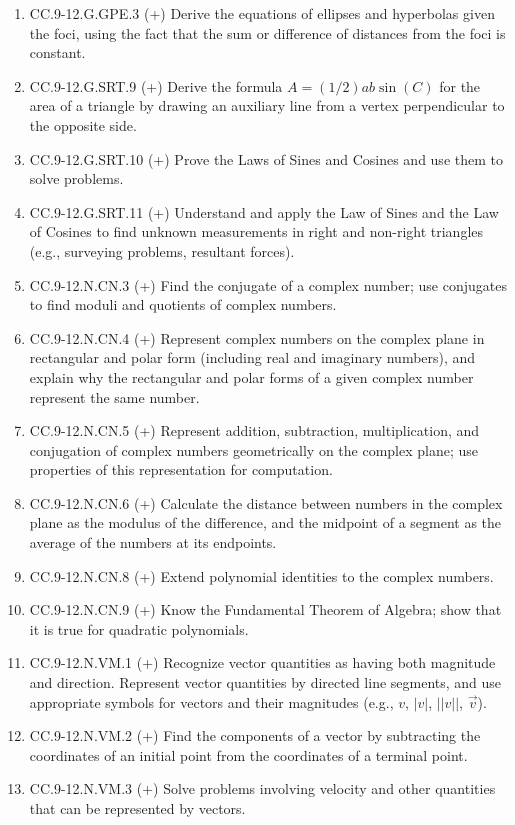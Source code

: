 \documentclass{article}
\begin{document}
\begin{enumerate}
	\item CC.9-12.G.GPE.3 (+)  Derive the equations of ellipses and hyperbolas given the foci, using the fact that the sum or difference of distances from the foci is constant.
	\item CC.9-12.G.SRT.9 (+)   Derive the formula $A = (1/2)ab \sin(C)$ for the area of a triangle by drawing an auxiliary line from a vertex perpendicular to the opposite side.
	\item CC.9-12.G.SRT.10 (+) Prove the Laws of Sines and Cosines and use them to solve problems.
	\item CC.9-12.G.SRT.11 (+)  Understand and apply the Law of Sines and the Law of Cosines to find unknown measurements in right and non-right triangles (e.g., surveying problems, resultant forces).
	\item CC.9-12.N.CN.3 (+)  Find the conjugate of a complex number; use conjugates to find moduli and quotients of complex numbers.
	\item CC.9-12.N.CN.4 (+) Represent complex numbers on the complex plane in rectangular and polar form (including real and imaginary numbers), and explain why the rectangular and polar forms of a given complex number represent the same number.
	\item CC.9-12.N.CN.5 (+) Represent addition, subtraction, multiplication, and conjugation of complex numbers geometrically on the complex plane; use properties of this representation for computation. 
	\item CC.9-12.N.CN.6 (+)  Calculate the distance between numbers in the complex plane as the modulus of the difference, and the midpoint of a segment as the average of the numbers at its endpoints.
	\item CC.9-12.N.CN.8 (+)  Extend polynomial identities to the complex numbers.
	\item CC.9-12.N.CN.9 (+)  Know the Fundamental Theorem of Algebra; show that it is true for quadratic polynomials.
	\item CC.9-12.N.VM.1 (+) Recognize vector quantities as having both magnitude and direction. Represent vector quantities by directed line segments, and use appropriate symbols for vectors and their magnitudes (e.g., \textbf{$v$}, $|$\textbf{$v$}$|$, $||$\textbf{$v$}$||$, $\vec{v}$).
	\item CC.9-12.N.VM.2 (+)  Find the components of a vector by subtracting the coordinates of an initial point from the coordinates of a terminal point.
	\item CC.9-12.N.VM.3 (+)   Solve problems involving velocity and other quantities that can be represented by vectors.

\end{enumerate}
\end{document}
